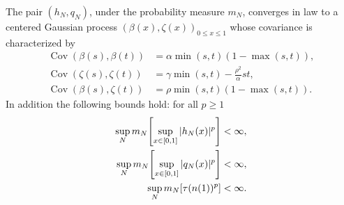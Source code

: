 \documentclass[AHL,Unicode,longabstracts]{cedram}
\DeclareMathOperator{\Cov}{Cov}
\theoremstyle{plain}
\let\originalleft\left
\let\originalright\right
\renewcommand{\left}{\mathopen{}\mathclose\bgroup\originalleft}
\renewcommand{\right}{\aftergroup\egroup\originalright}
\begin{document}
\begin{lemm}\label{Lemma:Gaussian}
The pair $(h_N,q_N)$, under the probability measure $m_N$, converges in law to a centered Gaussian process $(\beta(x),\zeta(x))_{0\le x \le 1}$ whose covariance is characterized by
\begin{align*}
\Cov(\beta(s),\beta(t)) &= \alpha \min(s,t)(1-\max(s,t)) ,\\
 \Cov(\zeta(s),\zeta(t)) &= \gamma \min(s,t) - \frac{\rho^2}{\alpha} st ,\\
\Cov(\beta(s),\zeta(t)) &= \rho \min(s,t)(1-\max(s,t)).
\end{align*}
In addition the following bounds hold: for all $p\ge 1$
\begin{align*}
\sup_N m_N\left[\sup_{x\in [0,1]} | h_N(x) |^p\right] &< \infty,\\
\sup_N m_N\left[\sup_{x\in [0,1]} | q_N(x) |^p\right] &< \infty, \\
\sup_N m_N[\tau(n(1))^p] &< \infty.
\end{align*}
\end{lemm}
\end{document}
